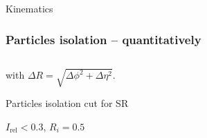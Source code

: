 \begin{frame}
\begin{block}{Kinematics}
\begin{minipage}{.55\linewidth}
\begin{center}
{}
\end{center}
\end{minipage}
\end{block}

\end{frame}



\begin{frame}\addtocounter{framenumber}{-1}
\frametitle{Particles isolation -- quantitatively}
\begin{block}{}
\begin{equation*}

\end{equation*}
\begin{center}
with $\Delta R = \sqrt{\Delta\phi^2+\Delta\eta^2}$.
\end{center}
\end{block}
\pause
\begin{block}{Particles isolation cut for SR}
\begin{center}
$I_\text{rel}<\num{0.3}$,
\qquad
$R_i = \num{0.5}$
\end{center}
\end{block}
\end{frame}


